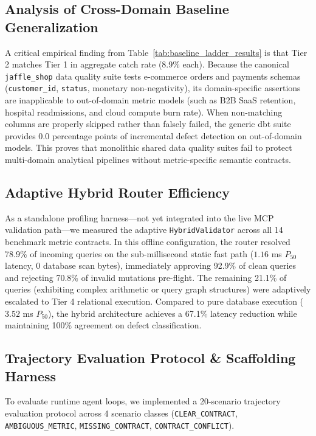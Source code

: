 \documentclass[11pt,a4paper]{article}
\begin{document}
\subsection{Analysis of Cross-Domain Baseline Generalization}
A critical empirical finding from Table~\ref{tab:baseline_ladder_results} is that Tier 2 matches Tier 1 in aggregate catch rate (8.9\% each). Because the canonical \texttt{jaffle\_shop} data quality suite tests e-commerce orders and payments schemas (\texttt{customer\_id}, \texttt{status}, monetary non-negativity), its domain-specific assertions are inapplicable to out-of-domain metric models (such as B2B SaaS retention, hospital readmissions, and cloud compute burn rate). When non-matching columns are properly skipped rather than falsely failed, the generic dbt suite provides 0.0 percentage points of incremental defect detection on out-of-domain models. This proves that monolithic shared data quality suites fail to protect multi-domain analytical pipelines without metric-specific semantic contracts.

\subsection{Adaptive Hybrid Router Efficiency}
As a standalone profiling harness---not yet integrated into the live MCP validation path---we measured the adaptive \texttt{HybridValidator} across all 14 benchmark metric contracts. In this offline configuration, the router resolved 78.9\% of incoming queries on the sub-millisecond static fast path ($1.16$ ms $P_{50}$ latency, 0 database scan bytes), immediately approving 92.9\% of clean queries and rejecting 70.8\% of invalid mutations pre-flight. The remaining 21.1\% of queries (exhibiting complex arithmetic or query graph structures) were adaptively escalated to Tier 4 relational execution. Compared to pure database execution ($3.52$ ms $P_{50}$), the hybrid architecture achieves a 67.1\% latency reduction while maintaining 100\% agreement on defect classification.

\subsection{Trajectory Evaluation Protocol \& Scaffolding Harness}
To evaluate runtime agent loops, we implemented a 20-scenario trajectory evaluation protocol across 4 scenario classes (\texttt{CLEAR\_CONTRACT}, \texttt{AMBIGUOUS\_METRIC}, \texttt{MISSING\_CONTRACT}, \texttt{CONTRACT\_CONFLICT}). 
\end{document}
